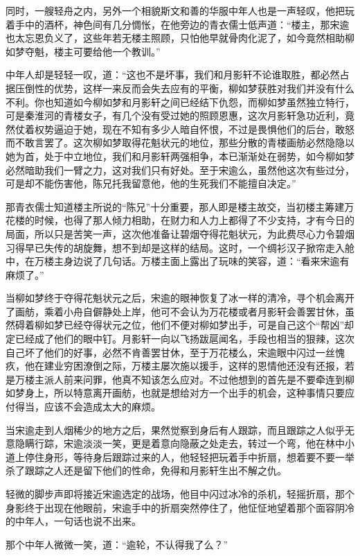 同时，一艘轻舟之内，另外一个相貌斯文和善的华服中年人也是一声轻叹，他把玩着手中的酒杯，神色间有几分惆怅，在他旁边的青衣儒士低声道：“楼主，那宋逾也太忘恩负义了，这些年若无楼主照顾，只怕他早就骨肉化泥了，如今竟然相助柳如梦夺魁，楼主可要给他一个教训。”

中年人却是轻轻一叹，道：“这也不是坏事，我们和月影轩不论谁取胜，都必然占据压倒性的优势，这样一来反而会失去应有的平衡，柳如梦获胜对我们并没有什么不利。你也知道如今柳如梦和月影轩之间已经结下仇怨，而柳如梦虽然独立特行，可是秦淮河的青楼女子，有几个没有受过她的照顾恩惠，这次月影轩急功近利，竟然仗着权势逼迫于她，现在不知有多少人暗自怀恨，不过是畏惧他们的后台，敢怒而不敢言罢了。这次柳如梦取得花魁状元的地位，那些分散的青楼画舫必然隐隐以她为首，处于中立地位，我们和月影轩两强相争，本已渐渐处在弱势，如今柳如梦必然暗助我们一臂之力，这对我们只有好处。至于宋逾么，虽然他这次有些过分，可是却不能伤害他，陈兄托我留意他，他的生死我们不能擅自决定。”

那青衣儒士知道楼主所说的“陈兄”十分重要，那人即是楼主故交，当初楼主筹建万花楼的时候，也得了那人倾力相助，在财力和人力上都得了不少支持，才有今日的局面，所以只是苦笑一声，这次他准备让碧烟夺得花魁状元，为此费尽心力令碧烟习得早已失传的胡旋舞，想不到却是这样的结局。这时，一个绸衫汉子掀帘走入舱中，在万楼主身边说了几句话。万楼主面上露出了玩味的笑容，道：“看来宋逾有麻烦了。”

当柳如梦终于夺得花魁状元之后，宋逾的眼神恢复了冰一样的清冷，寻个机会离开了画舫，乘着小舟自僻静处上岸，他可不会认为万花楼或者月影轩会善罢甘休，虽然碍着柳如梦已经夺得状元之位，他们不便对柳如梦出手，可是自己这个“帮凶”却定已经成了他们的眼中钉。月影轩一向以飞扬跋扈闻名，手段也相当的狠辣，这次自己坏了他们的好事，必然不肯善罢甘休，至于万花楼么，宋逾眼中闪过一丝愧疚，他在建业穷困潦倒之际，万楼主屡次施以援手，这样的恩情他还没有还报，若是万楼主派人前来问罪，他真不知该怎么应对。不过他想到的首先是不要牵连到柳如梦身上，所以特意离开画舫，也就是想给对方一个出手的机会，这种事情只要应付得当，应该不会造成太大的麻烦。

当宋逾走到人烟稀少的地方之后，果然觉察到身后有人跟踪，而且跟踪之人似乎无意隐瞒行踪，宋逾淡淡一笑，更是着意向隐蔽之处走去，转过一个弯，他在林中小道上停住身形，等待身后跟踪过来的人，他轻轻把玩着手中折扇，想着要不要一举杀了跟踪之人还是留下他们的性命，免得和月影轩生出不解之仇。

轻微的脚步声即将接近宋逾选定的战场，他目中闪过冰冷的杀机，轻摇折扇，那个身影终于出现在他眼前，宋逾手中的折扇突然停住了，他怔怔地望着那个面容阴冷的中年人，一句话也说不出来。

那个中年人微微一笑，道：“逾轮，不认得我了么？”

